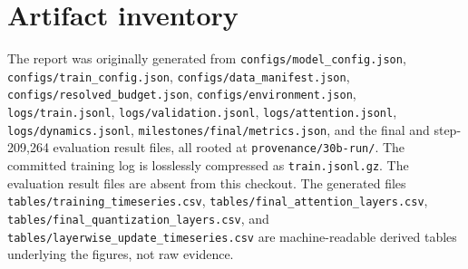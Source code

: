 \documentclass[10pt]{article}
\begin{document}
\section{Artifact inventory}
The report was originally generated from \texttt{configs/model\_config.json}, \texttt{configs/train\_config.json}, \texttt{configs/data\_manifest.json}, \texttt{configs/resolved\_budget.json}, \texttt{configs/environment.json}, \texttt{logs/train.jsonl}, \texttt{logs/validation.jsonl}, \texttt{logs/attention.jsonl}, \texttt{logs/dynamics.jsonl}, \texttt{milestones/final/metrics.json}, and the final and step-209,264 evaluation result files, all rooted at \texttt{provenance/30b-run/}. The committed training log is losslessly compressed as \texttt{train.jsonl.gz}. The evaluation result files are absent from this checkout. The generated files \texttt{tables/training\_timeseries.csv}, \texttt{tables/final\_attention\_layers.csv}, \texttt{tables/final\_quantization\_layers.csv}, and \texttt{tables/layerwise\_update\_timeseries.csv} are machine-readable derived tables underlying the figures, not raw evidence.
\end{document}
